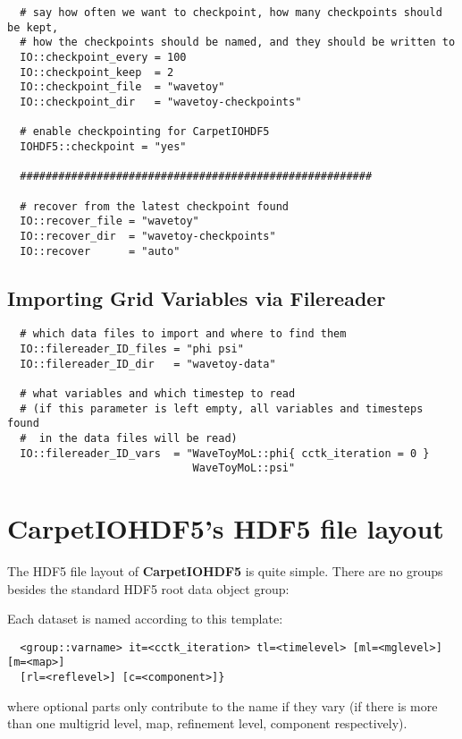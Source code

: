 \documentclass{article}
\begin{document}
\begin{verbatim}
  # say how often we want to checkpoint, how many checkpoints should be kept,
  # how the checkpoints should be named, and they should be written to
  IO::checkpoint_every = 100
  IO::checkpoint_keep  = 2
  IO::checkpoint_file  = "wavetoy"
  IO::checkpoint_dir   = "wavetoy-checkpoints"

  # enable checkpointing for CarpetIOHDF5
  IOHDF5::checkpoint = "yes"

  #######################################################

  # recover from the latest checkpoint found
  IO::recover_file = "wavetoy"
  IO::recover_dir  = "wavetoy-checkpoints"
  IO::recover      = "auto"
\end{verbatim}

\subsection{Importing Grid Variables via Filereader}

\begin{verbatim}
  # which data files to import and where to find them
  IO::filereader_ID_files = "phi psi"
  IO::filereader_ID_dir   = "wavetoy-data"

  # what variables and which timestep to read
  # (if this parameter is left empty, all variables and timesteps found
  #  in the data files will be read)
  IO::filereader_ID_vars  = "WaveToyMoL::phi{ cctk_iteration = 0 }
                             WaveToyMoL::psi"
\end{verbatim}


\iffalse
\section{CarpetIOHDF5's HDF5 file layout}

The HDF5 file layout of {\bf CarpetIOHDF5} is quite simple.
There are no groups besides the standard HDF5 root data object group:

Each dataset is named according to this template:

\begin{verbatim}
  <group::varname> it=<cctk_iteration> tl=<timelevel> [ml=<mglevel>] [m=<map>]
  [rl=<reflevel>] [c=<component>]}
\end{verbatim}

where optional parts only contribute to the name if they vary (if there is
more than one multigrid level, map, refinement level, component respectively).
\end{document}
